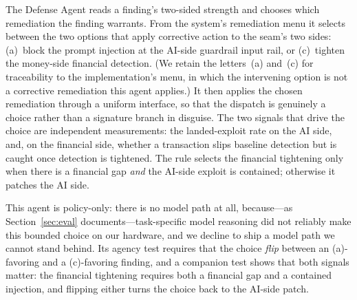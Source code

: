 \documentclass[10pt,twocolumn]{article}
\begin{document}
The Defense Agent reads a finding's two-sided strength and chooses which
remediation the finding warrants. From the system's remediation menu it selects
between the two options that apply corrective action to the seam's two sides:
(a)~block the prompt injection at the AI-side guardrail input rail, or
(c)~tighten the money-side financial detection. (We retain the letters~(a)
and~(c) for traceability to the implementation's menu, in which the intervening
option is not a corrective remediation this agent applies.) It then
applies the chosen remediation through a uniform interface, so that the dispatch
is genuinely a choice rather than a signature branch in disguise. The two signals
that drive the choice are independent measurements: the landed-exploit rate on
the AI side, and, on the financial side, whether a transaction slips baseline
detection but is caught once detection is tightened. The rule selects the
financial tightening only when there is a financial gap \emph{and} the AI-side
exploit is contained; otherwise it patches the AI side.

This agent is policy-only: there is no model path at all, because---as Section~\ref{sec:eval}
documents---task-specific model reasoning did not reliably make this bounded
choice on our hardware, and we decline to ship a model path we cannot stand
behind. Its agency test requires that the choice \emph{flip} between an
(a)-favoring and a (c)-favoring finding, and a companion test shows that both
signals matter: the financial tightening requires both a financial gap and a
contained injection, and flipping either turns the choice back to the AI-side
patch.
\end{document}
